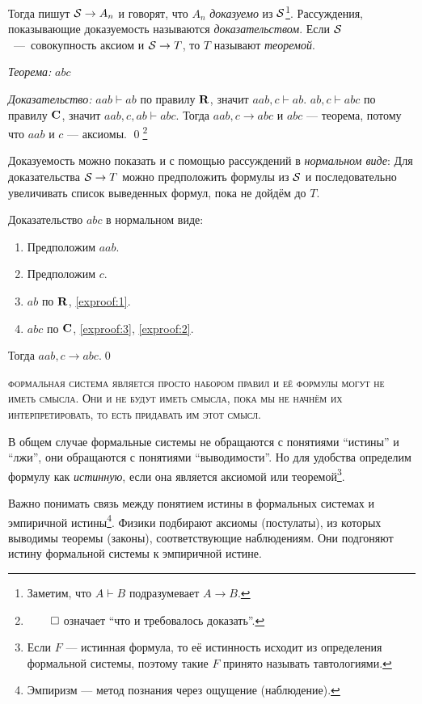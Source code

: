 Тогда пишут $\mathcal S\to A_{n}$ и говорят, что $A_{n}$ {\it доказуемо} из $\mathcal S$\footnote{
	Заметим, что $A\vdash B$ подразумевает $A\to B$.
}.
Рассуждения, показывающие доказуемость называются {\it доказательством}.
Если $\mathcal S$~---~совокупность аксиом и $\mathcal S\to T$, то $T$ называют
{\it теоремой}.

{\it Теорема:} $abc$

{\it Доказательство:}
$aab\vdash ab$ по правилу $\mathbf{R}$, значит $aab,c\vdash ab$.
$ab,c\vdash abc$ по правилу $\mathbf{C}$, значит $aab,c,ab\vdash abc$.
Тогда $aab,c\to abc$ и $abc$ --- теорема, потому что $aab$ и $c$ --- аксиомы.
\qed\footnote{$\qed$ означает ``что и требовалось доказать''.}

Доказуемость можно показать и с помощью рассуждений в {\it нормальном виде}:
Для доказательства $\mathcal S\to T$ можно предположить формулы из $\mathcal S$ и последовательно
увеличивать список выведенных формул, пока не дойдём до $T$.

\pagebreak

Доказательство $abc$ в нормальном виде:
\begin{enumerate}[label=(\arabic*)]
	\item{}Предположим $aab$.\label{exproof:1}
	\item{}Предположим $c$.\label{exproof:2}
	\item{}$ab$ по $\mathbf{R}$, \ref{exproof:1}.\label{exproof:3}
	\item{}$abc$ по $\mathbf{C}$, \ref{exproof:3}, \ref{exproof:2}.
\end{enumerate}

Тогда $aab,c\to abc$.\qed

\textsc{формальная система является просто набором правил и её формулы
	могут не иметь смысла. Они и не будут иметь смысла, пока мы не начнём их
	интерпретировать, то есть придавать им этот смысл.}

В общем случае формальные системы не обращаются с понятиями ``истины'' и ``лжи'',
они обращаются с понятиями ``выводимости''. Но для удобства определим формулу
как {\it истинную}, если она является аксиомой или теоремой\footnote{
	Если $F$ --- истинная формула, то её истинность исходит из
	определения формальной системы, поэтому такие $F$ принято называть тавтологиями.
}.

Важно понимать связь между понятием истины в формальных системах
и эмпиричной истины\footnote{Эмпиризм --- метод познания через ощущение (наблюдение).}.
Физики подбирают аксиомы (постулаты),
из которых выводимы теоремы (законы), соответствующие наблюдениям.
Они подгоняют истину формальной системы к эмпиричной истине.

